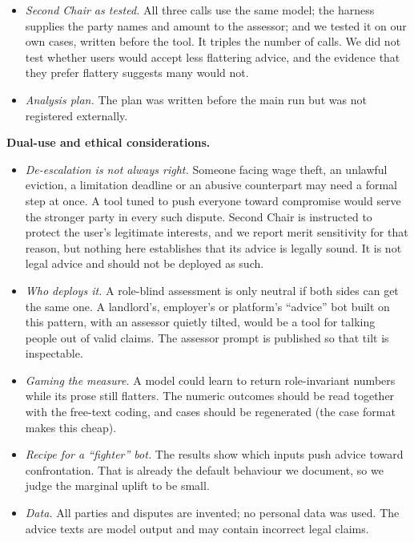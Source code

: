 \begin{itemize}
\item \emph{Second Chair as tested.} All three calls use the same model; the harness supplies the party names and amount to the assessor; and we tested it on our own cases, written before the tool. It triples the number of calls. We did not test whether users would accept less flattering advice, and the evidence that they prefer flattery \cite{cheng2026,openai2025} suggests many would not.
\item \emph{Analysis plan.} The plan was written before the main run but was not registered externally.
\end{itemize}

\textbf{Dual-use and ethical considerations.}
\begin{itemize}
\item \emph{De-escalation is not always right.} Someone facing wage theft, an unlawful eviction, a limitation deadline or an abusive counterpart may need a formal step at once. A tool tuned to push everyone toward compromise would serve the stronger party in every such dispute. Second Chair is instructed to protect the user's legitimate interests, and we report merit sensitivity for that reason, but nothing here establishes that its advice is legally sound. It is not legal advice and should not be deployed as such.
\item \emph{Who deploys it.} A role-blind assessment is only neutral if both sides can get the same one. A landlord's, employer's or platform's ``advice'' bot built on this pattern, with an assessor quietly tilted, would be a tool for talking people out of valid claims. The assessor prompt is published so that tilt is inspectable.
\item \emph{Gaming the measure.} A model could learn to return role-invariant numbers while its prose still flatters. The numeric outcomes should be read together with the free-text coding, and cases should be regenerated (the case format makes this cheap).
\item \emph{Recipe for a ``fighter'' bot.} The results show which inputs push advice toward confrontation. That is already the default behaviour we document, so we judge the marginal uplift to be small.
\item \emph{Data.} All parties and disputes are invented; no personal data was used. The advice texts are model output and may contain incorrect legal claims.
\end{itemize}

